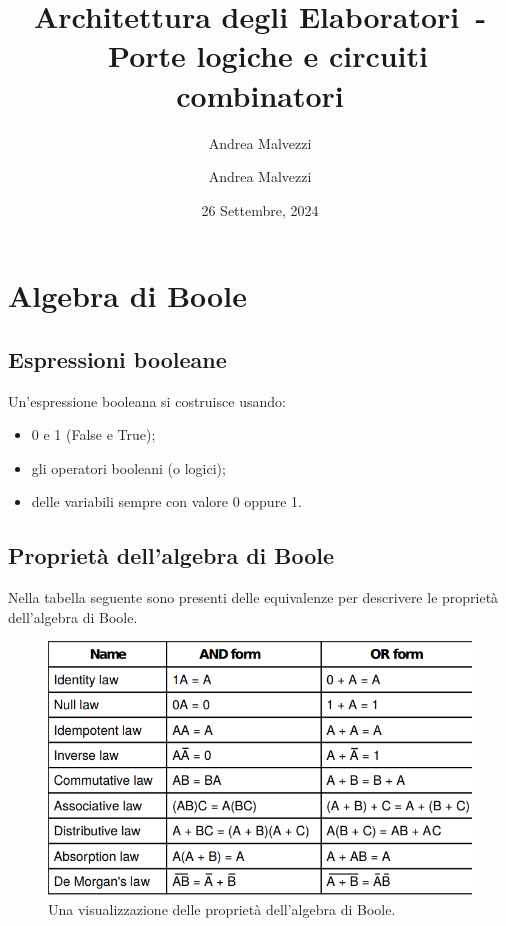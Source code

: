 \documentclass[12pt]{article}
\author{Andrea Malvezzi}
\title{\textbf{Architettura degli Elaboratori~-~Porte logiche e circuiti combinatori}}  %
\date{26 Settembre, 2024}
\author{Andrea Malvezzi}
\begin{document}
\maketitle
\pagebreak
\tableofcontents
\pagebreak
\section{Algebra di Boole}
\subsection{Espressioni booleane}
Un'espressione booleana si costruisce usando:
\begin{itemize}
    \item 0 e 1 (False e True);
    \item gli operatori booleani (o logici);
    \item delle variabili sempre con valore 0 oppure 1.
\end{itemize}
\subsection{Proprietà dell'algebra di Boole}
Nella tabella seguente sono presenti delle equivalenze per descrivere le proprietà dell'algebra di Boole.
\begin{figure}[!htb]
    \centering
    \includegraphics[width=1\textwidth, height=.7\textheight,keepaspectratio]{porte_logiche/properties_boole.png} %
    \begin{center}
        \caption{\label{fig:properties_boolean_algebra}Una visualizzazione delle proprietà dell'algebra di Boole.} %
    \end{center}
\end{figure}
\pagebreak
\end{document}
